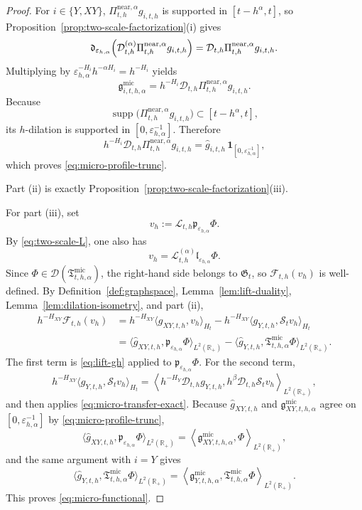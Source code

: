 \documentclass[11pt,a4paper]{amsart}
\theoremstyle{plain}
\theoremstyle{definition}
\theoremstyle{remark}
\newcommand{\R}{\mathbb{R}}
\newcommand{\one}{\mathbf 1}
\begin{document}
\begin{proof}
For \(i\in\{Y,XY\}\), \(\Pi_{t,h}^{\mathrm{near},\alpha}g_{i,t,h}\) is supported in
\([t-h^\alpha,t]\), so Proposition~\ref{prop:two-scale-factorization}(i) gives
\[
\mathfrak d_{\varepsilon_{h,\alpha}}
\Bigl(
\mathcal D_{t,h}^{(\alpha)}
\Pi_{t,h}^{\mathrm{near},\alpha}g_{i,t,h}
\Bigr)
=
\mathcal D_{t,h}\Pi_{t,h}^{\mathrm{near},\alpha}g_{i,t,h}.
\]
Multiplying by \(\varepsilon_{h,\alpha}^{-H_i}h^{-\alpha H_i}=h^{-H_i}\) yields
\[
\mathfrak g_{i,t,h,\alpha}^{\mathrm{mic}}
=
h^{-H_i}
\mathcal D_{t,h}\Pi_{t,h}^{\mathrm{near},\alpha}g_{i,t,h}.
\]
Because
\[
\operatorname{supp}\bigl(\Pi_{t,h}^{\mathrm{near},\alpha}g_{i,t,h}\bigr)
\subset [t-h^\alpha,t],
\]
its \(h\)-dilation is supported in \([0,\varepsilon_{h,\alpha}^{-1}]\). Therefore
\[
h^{-H_i}
\mathcal D_{t,h}\Pi_{t,h}^{\mathrm{near},\alpha}g_{i,t,h}
=
\widehat g_{i,t,h}\,\one_{[0,\varepsilon_{h,\alpha}^{-1}]},
\]
which proves \eqref{eq:micro-profile-trunc}.

Part (ii) is exactly Proposition~\ref{prop:two-scale-factorization}(iii).

For part (iii), set
\[
v_h:=\mathcal L_{t,h}\mathfrak p_{\varepsilon_{h,\alpha}}\Phi.
\]
By \eqref{eq:two-scale-L}, one also has
\[
v_h=\mathcal L_{t,h}^{(\alpha)}\mathfrak l_{\varepsilon_{h,\alpha}}\Phi.
\]
Since \(\Phi\in\mathcal D(\mathfrak T_{t,h,\alpha}^{\mathrm{mic}})\), the right-hand side belongs to
\(\mathfrak G_t\), so \(\mathcal F_{t,h}(v_h)\) is well-defined. By
Definition~\ref{def:graphspace}, Lemma~\ref{lem:lift-duality},
Lemma~\ref{lem:dilation-isometry}, and part (ii),
\begin{align*}
h^{-H_{XY}}\mathcal F_{t,h}(v_h)
&=
h^{-H_{XY}}
\langle g_{XY,t,h},v_h\rangle_{H_t}
-
h^{-H_{XY}}\langle g_{Y,t,h},\mathcal S_t v_h\rangle_{H_t} \\
&=
\langle \widehat g_{XY,t,h},\mathfrak p_{\varepsilon_{h,\alpha}}\Phi\rangle_{L^2(\R_+)}
-
\langle \widehat g_{Y,t,h},\mathfrak T_{t,h,\alpha}^{\mathrm{mic}}\Phi\rangle_{L^2(\R_+)}.
\end{align*}
The first term is \eqref{eq:lift-gh} applied to
\(\mathfrak p_{\varepsilon_{h,\alpha}}\Phi\). For the second term,
\[
h^{-H_{XY}}\langle g_{Y,t,h},\mathcal S_t v_h\rangle_{H_t}
=
\left\langle
h^{-H_Y}\mathcal D_{t,h}g_{Y,t,h},
h^\beta \mathcal D_{t,h}\mathcal S_t v_h
\right\rangle_{L^2(\R_+)},
\]
and then applies \eqref{eq:micro-transfer-exact}.
Because \(\widehat g_{XY,t,h}\) and \(\mathfrak g_{XY,t,h,\alpha}^{\mathrm{mic}}\) agree on
\([0,\varepsilon_{h,\alpha}^{-1}]\) by \eqref{eq:micro-profile-trunc},
\[
\langle \widehat g_{XY,t,h},\mathfrak p_{\varepsilon_{h,\alpha}}\Phi\rangle_{L^2(\R_+)}
=
\left\langle
\mathfrak g_{XY,t,h,\alpha}^{\mathrm{mic}},\Phi
\right\rangle_{L^2(\R_+)},
\]
and the same argument with \(i=Y\) gives
\[
\langle \widehat g_{Y,t,h},\mathfrak T_{t,h,\alpha}^{\mathrm{mic}}\Phi\rangle_{L^2(\R_+)}
=
\left\langle
\mathfrak g_{Y,t,h,\alpha}^{\mathrm{mic}},
\mathfrak T_{t,h,\alpha}^{\mathrm{mic}}\Phi
\right\rangle_{L^2(\R_+)}.
\]
This proves \eqref{eq:micro-functional}.
\end{proof}
\end{document}
